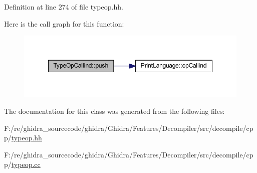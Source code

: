 Definition at line 274 of file typeop.\+hh.

Here is the call graph for this function\+:
\nopagebreak
\begin{figure}[H]
\begin{center}
\leavevmode
\includegraphics[width=348pt]{class_type_op_callind_adcb3858720f0774e85cb5e2e7ced8abd_cgraph}
\end{center}
\end{figure}


The documentation for this class was generated from the following files\+:\begin{DoxyCompactItemize}
\item 
F\+:/re/ghidra\+\_\+sourcecode/ghidra/\+Ghidra/\+Features/\+Decompiler/src/decompile/cpp/\mbox{\hyperlink{typeop_8hh}{typeop.\+hh}}\item 
F\+:/re/ghidra\+\_\+sourcecode/ghidra/\+Ghidra/\+Features/\+Decompiler/src/decompile/cpp/\mbox{\hyperlink{typeop_8cc}{typeop.\+cc}}\end{DoxyCompactItemize}
